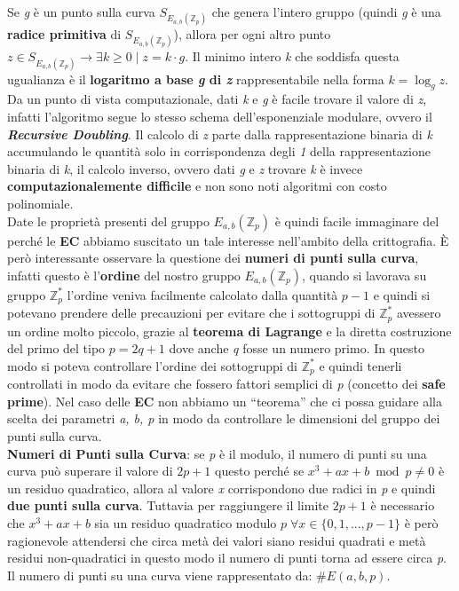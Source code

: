 Se \textit{g} è un punto sulla curva $S_{E_{a,b}(\mathbb{Z}_p)}$ che genera l'intero gruppo (quindi \textit{g} è una \textbf{radice primitiva} di $S_{E_{a,b}(\mathbb{Z}_p)}$), allora per ogni altro punto $z \in S_{E_{a,b}(\mathbb{Z}_p)} \rightarrow \exists k \geq 0 \; | \; z = k \cdot g$. Il minimo intero \textit{k} che soddisfa questa ugualianza è il \textbf{logaritmo a base \textit{g} di \textit{z}} rappresentabile nella forma $k = \log_{g}{z}$. Da un punto di vista computazionale, dati \textit{k} e \textit{g} è facile trovare il valore di \textit{z}, infatti l'algoritmo segue lo stesso schema dell'esponenziale modulare, ovvero il \textbf{\textit{Recursive Doubling}}. Il calcolo di \textit{z} parte dalla rappresentazione binaria di \textit{k} accumulando le quantità solo in corrispondenza degli \textit{1} della rappresentazione binaria di \textit{k}, il calcolo inverso, ovvero dati \textit{g} e \textit{z} trovare \textit{k} è invece \textbf{computazionalemente difficile} e non sono noti algoritmi con costo polinomiale. \\
Date le proprietà presenti del gruppo $E_{a,b}(\mathbb{Z}_p)$ è quindi facile immaginare del perché le \textbf{EC} abbiamo suscitato un tale interesse nell'ambito della crittografia. È però interessante osservare la questione dei \textbf{numeri di punti sulla curva}, infatti questo è l'\textbf{ordine} del nostro gruppo $E_{a,b}(\mathbb{Z}_p)$, quando si lavorava su gruppo $\mathbb{Z}_p^*$ l'ordine veniva facilmente calcolato dalla quantità $p - 1$ e quindi si potevano prendere delle precauzioni per evitare che i sottogruppi di $\mathbb{Z}_p^*$ avessero un ordine molto piccolo, grazie al \textbf{teorema di Lagrange} e la diretta costruzione del primo del tipo $p = 2q + 1$ dove anche \textit{q} fosse un numero primo. In questo modo si poteva controllare l'ordine dei sottogruppi di $\mathbb{Z}_p^*$ e quindi tenerli controllati in modo da evitare che fossero fattori semplici di \textit{p} (concetto dei \textbf{safe prime}). Nel caso delle \textbf{EC} non abbiamo un ``teorema'' che ci possa guidare alla scelta dei parametri \textit{a, b, p} in modo da controllare le dimensioni del gruppo dei punti sulla curva. 
\\ \newline
\textbf{Numeri di Punti sulla Curva}: se \textit{p} è il modulo, il numero di punti su una curva può superare il valore di $2p + 1$ questo perché se $x^3 + ax + b \bmod p \neq 0$ è un residuo quadratico, allora al valore \textit{x} corrispondono due radici in \textit{p} e quindi \textbf{due punti sulla curva}. Tuttavia per raggiungere il limite $2p + 1$ è necessario che $x^3 + ax + b$ sia un residuo quadratico modulo $p \; \forall x \in \{0, 1, ..., p - 1\}$ è però ragionevole attendersi che circa metà dei valori siano residui quadrati e metà residui non-quadratici in questo modo il numero di punti torna ad essere circa \textit{p}. Il numero di punti su una curva viene rappresentato da: $\#E(a, b, p)$. \\
